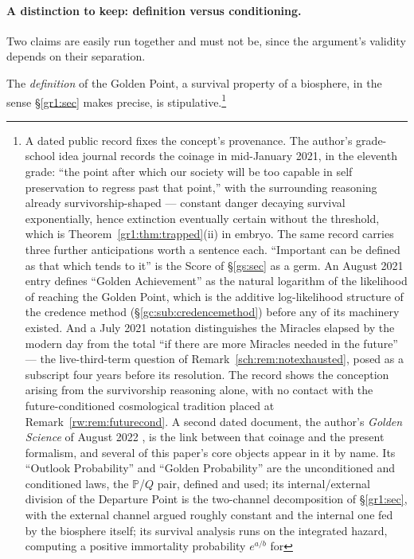 \documentclass[11pt]{article}
\numberwithin{equation}{section}
\theoremstyle{plain}
\theoremstyle{definition}
\theoremstyle{remark}
\newcommand{\PP}{\mathbb{P}}
\begin{document}
\paragraph{A distinction to keep: definition versus conditioning.}\label{gc:rem:defvscond}
Two claims are easily run together and must not be, since the argument's
validity depends on their separation.

The \emph{definition} of the Golden Point, a survival property of a
biosphere, in the sense \S\ref{gr1:sec} makes precise, is
stipulative.\footnote{A dated public record fixes the concept's
provenance. The author's grade-school idea journal
\cite{BenGradeSchool} records the coinage in mid-January 2021, in the
eleventh grade: ``the point after which our society will be too
capable in self preservation to regress past that point,'' with the
surrounding reasoning already survivorship-shaped --- constant danger
decaying survival exponentially, hence extinction eventually certain
without the threshold, which is Theorem~\ref{gr1:thm:trapped}(ii) in
embryo. The same record carries three further anticipations worth a
sentence each. ``Important can be defined as that which tends to
it'' is the Score of \S\ref{gs:sec} as a germ. An August 2021 entry
defines ``Golden Achievement'' as the natural logarithm of the
likelihood of reaching the Golden Point, which is the additive
log-likelihood structure of the credence method
(\S\ref{gc:sub:credencemethod}) before any of its machinery existed.
And a July 2021 notation distinguishes the Miracles elapsed by the
modern day from the total ``if there are more Miracles needed in the
future'' --- the live-third-term question of
Remark~\ref{sch:rem:notexhausted}, posed as a subscript four years
before its resolution. The record shows the conception arising from
the survivorship reasoning alone, with no contact with the
future-conditioned cosmological tradition placed at
Remark~\ref{rw:rem:futurecond}. A second dated document, the
author's \emph{Golden Science} of August 2022 \cite{BenGolden22},
is the link between that coinage and the present formalism, and
several of this paper's core objects appear in it by name. Its
``Outlook Probability'' and ``Golden Probability'' are the
unconditioned and conditioned laws, the $\PP$/$Q$ pair, defined and
used; its internal/external division of the Departure Point is the
two-channel decomposition of \S\ref{gr1:sec}, with the external
channel argued roughly constant and the internal one fed by the
biosphere itself; its survival analysis runs on the integrated
hazard, computing a positive immortality probability $e^{a/b}$ for
}
\end{document}

